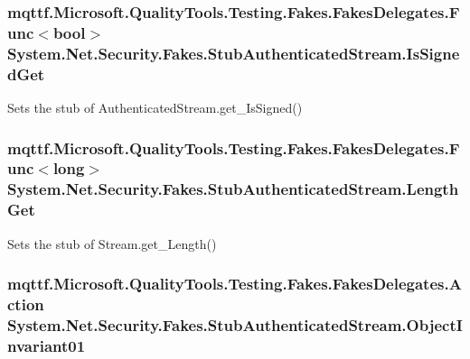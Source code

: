 \hypertarget{class_system_1_1_net_1_1_security_1_1_fakes_1_1_stub_authenticated_stream_aed4f1421b66101b1ebfcae5c6a98aedb}{
\subsubsection[{Is\-Signed\-Get}]{\setlength{\rightskip}{0pt plus 5cm}mqttf.\-Microsoft.\-Quality\-Tools.\-Testing.\-Fakes.\-Fakes\-Delegates.\-Func$<$bool$>$ System.\-Net.\-Security.\-Fakes.\-Stub\-Authenticated\-Stream.\-Is\-Signed\-Get}}\label{class_system_1_1_net_1_1_security_1_1_fakes_1_1_stub_authenticated_stream_aed4f1421b66101b1ebfcae5c6a98aedb}


Sets the stub of Authenticated\-Stream.\-get\-\_\-\-Is\-Signed()

\hypertarget{class_system_1_1_net_1_1_security_1_1_fakes_1_1_stub_authenticated_stream_abb5f96c86e4ea3bdee34dbc2ecce3a31}{
\subsubsection[{Length\-Get}]{\setlength{\rightskip}{0pt plus 5cm}mqttf.\-Microsoft.\-Quality\-Tools.\-Testing.\-Fakes.\-Fakes\-Delegates.\-Func$<$long$>$ System.\-Net.\-Security.\-Fakes.\-Stub\-Authenticated\-Stream.\-Length\-Get}}\label{class_system_1_1_net_1_1_security_1_1_fakes_1_1_stub_authenticated_stream_abb5f96c86e4ea3bdee34dbc2ecce3a31}


Sets the stub of Stream.\-get\-\_\-\-Length()

\hypertarget{class_system_1_1_net_1_1_security_1_1_fakes_1_1_stub_authenticated_stream_adabfd1a23da6aadb43f6139188c0e4de}{
\subsubsection[{Object\-Invariant01}]{\setlength{\rightskip}{0pt plus 5cm}mqttf.\-Microsoft.\-Quality\-Tools.\-Testing.\-Fakes.\-Fakes\-Delegates.\-Action System.\-Net.\-Security.\-Fakes.\-Stub\-Authenticated\-Stream.\-Object\-Invariant01}}\label{class_system_1_1_net_1_1_security_1_1_fakes_1_1_stub_authenticated_stream_adabfd1a23da6aadb43f6139188c0e4de}


